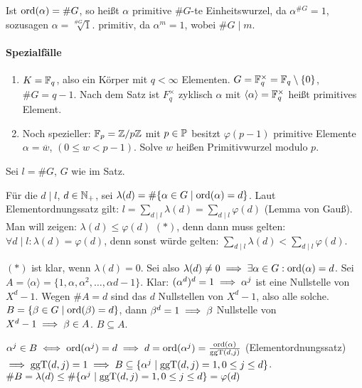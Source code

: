 \documentclass[a4paper,twoside,DIV15,BCOR12mm]{scrbook}
\begin{document}
\begin{bemerkung}
Ist $\mathop{\rm ord}\nolimits(\alpha)=\#G$, so heißt $\alpha$ primitive $\#G$-te
Einheitswurzel, da $\alpha^{\#G}=1$, sozusagen $\alpha =
\sqrt[\#G]{1}$. primitiv, da $\alpha^m=1$, wobei $\#G\mid m$.
\end{bemerkung}

\paragraph{Spezialfälle}
\begin{enumerate}
\item $K=\mathbb{F}_q$, also ein Körper mit $q<\infty$ Elementen. $G=\mathbb{F}_q^\times=\mathbb{F}_q\setminus\{0\}$, $\#G=q-1$. Nach dem Satz ist $F_q^\times$ zyklisch $\alpha$ mit $\langle \alpha\rangle=\mathbb{F}_q^\times$ heißt primitives Element.
\item Noch spezieller: $\mathbb{F}_p = \mathbb{Z}/p\mathbb{Z}$ mit $p\in\mathbb{P}$ besitzt $\varphi(p-1)$ primitive Elemente $\alpha = \overline w$, $(0\le w < p-1)$. Solve $w$ heißen Primitivwurzel modulo $p$.
\end{enumerate}

\begin{beweis}
Sei $l = \#G$, $G$ wie im Satz.

Für die $d\mid l$, $d\in\mathbb{N}_+$, sei $\lambda(d)=\#\{\alpha \in G\mid
\mathop{\rm ord}\nolimits(\alpha)=d\}$. Laut Elementordnungssatz gilt: $l = \sum_{d\mid
l}\lambda(d) = \sum_{d\mid l} \varphi(d)$ (Lemma von Gauß). Man will
zeigen: $\lambda(d)\le \varphi(d)$ $(*)$, denn dann muss gelten:
$\forall d\mid l: \lambda(d)=\varphi(d)$, denn sonst würde gelten:
$\sum_{d\mid l}\lambda(d) < \sum_{d\mid l} \varphi(d)$.

$(*)$ ist klar, wenn $\lambda(d) = 0$. Sei also $\lambda(d)\ne 0
\implies \exists \alpha \in G: \mathop{\rm ord}\nolimits(\alpha) = d$. Sei $A=\langle
\alpha \rangle = \{1,\alpha,\alpha^2,\ldots,\alpha{d-1}\}$. Klar:
$(\alpha^d)^d = 1 \implies \alpha^j$ ist eine Nullstelle von $X^d-1$.
Wegen $\#A = d$ sind das $d$ Nullstellen von $X^d-1$, also alle
solche. $B=\{\beta \in G\mid \mathop{\rm ord}\nolimits(\beta) = d \}$, dann $\beta^d = 1
\implies \beta$ Nullstelle von $X^d-1\implies \beta\in A$. $B\subseteq
A$.

$\alpha^j\in B \iff \mathop{\rm ord}\nolimits(\alpha^j) = d \implies d= \mathop{\rm ord}\nolimits(\alpha^j) =
\frac{\mathop{\rm ord}\nolimits(\alpha)}{\mathop{\rm ggT}\nolimits(d,j)}$ (Elementordnungssatz) $\implies
\mathop{\rm ggT}\nolimits(d,j) = 1 \implies B\subseteq \{\alpha ^j \mid \mathop{\rm ggT}\nolimits(d,j)=1, 0\le j
\le d\}$. $\#B=\lambda(d)\le \#\{\alpha ^j \mid \mathop{\rm ggT}\nolimits(d,j)=1, 0\le j
\le d\} = \varphi(d)$

\end{beweis}
\end{document}
